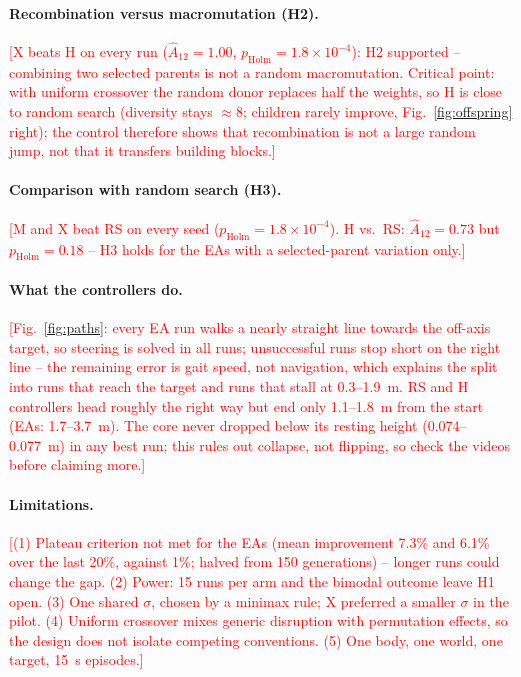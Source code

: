 \documentclass[sigconf,nonacm]{acmart}
\newcommand{\todo}[1]{\textcolor{red}{[#1]}}
\newcommand{\cfgM}{\textsf{M}}     %
\newcommand{\cfgX}{\textsf{X}}     %
\newcommand{\cfgH}{\textsf{H}}    %
\newcommand{\cfgRS}{\textsf{RS}}   %
\begin{document}
\paragraph{Recombination versus macromutation (H2).}
\todo{\cfgX{} beats \cfgH{} on every run ($\hat{A}_{12} = 1.00$, $p_\text{Holm} = 1.8\times10^{-4}$): H2 supported -- combining two selected parents is not a random macromutation. Critical point: with uniform crossover the random donor replaces half the weights, so \cfgH{} is close to random search (diversity stays $\approx 8$; children rarely improve, Fig.~\ref{fig:offspring} right); the control therefore shows that recombination is not a large random jump, not that it transfers building blocks.}

\paragraph{Comparison with random search (H3).}
\todo{\cfgM{} and \cfgX{} beat \cfgRS{} on every seed ($p_\text{Holm} = 1.8\times10^{-4}$). \cfgH{} vs.\ \cfgRS{}: $\hat{A}_{12} = 0.73$ but $p_\text{Holm} = 0.18$ -- H3 holds for the EAs with a selected-parent variation only.}

\paragraph{What the controllers do.}
\todo{Fig.~\ref{fig:paths}: every EA run walks a nearly straight line towards the off-axis target, so steering is solved in all runs; unsuccessful runs stop short on the right line -- the remaining error is gait speed, not navigation, which explains the split into runs that reach the target and runs that stall at 0.3--1.9~m. \cfgRS{} and \cfgH{} controllers head roughly the right way but end only 1.1--1.8~m from the start (EAs: 1.7--3.7~m). The core never dropped below its resting height (0.074--0.077~m) in any best run; this rules out collapse, not flipping, so check the videos before claiming more.}

\paragraph{Limitations.}
\todo{(1) Plateau criterion not met for the EAs (mean improvement 7.3\% and 6.1\% over the last 20\%, against 1\%; halved from 150 generations) -- longer runs could change the gap. (2) Power: 15 runs per arm and the bimodal outcome leave H1 open. (3) One shared $\sigma$, chosen by a minimax rule; \cfgX{} preferred a smaller $\sigma$ in the pilot. (4) Uniform crossover mixes generic disruption with permutation effects, so the design does not isolate competing conventions. (5) One body, one world, one target, 15~s episodes.}
\end{document}
